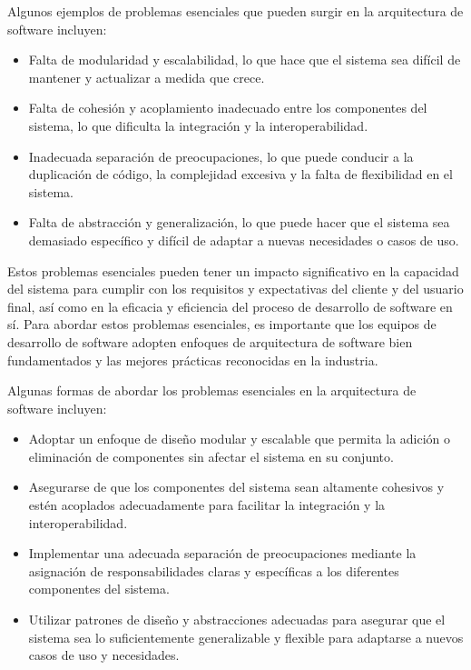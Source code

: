 \documentclass[executivepaper]{article}
\begin{document}
Algunos ejemplos de problemas esenciales que pueden surgir en la arquitectura de software incluyen:

\begin{itemize}
\item Falta de modularidad y escalabilidad, lo que hace que el sistema sea difícil de mantener y actualizar a medida que crece.
\item Falta de cohesión y acoplamiento inadecuado entre los componentes del sistema, lo que dificulta la integración y la interoperabilidad.
\item Inadecuada separación de preocupaciones, lo que puede conducir a la duplicación de código, la complejidad excesiva y la falta de flexibilidad en el sistema.
\item Falta de abstracción y generalización, lo que puede hacer que el sistema sea demasiado específico y difícil de adaptar a nuevas necesidades o casos de uso.
\end{itemize}

Estos problemas esenciales pueden tener un impacto significativo en la capacidad del sistema para cumplir con los requisitos y expectativas del cliente y del usuario final, así como en la eficacia y eficiencia del proceso de desarrollo de software en sí. Para abordar estos problemas esenciales, es importante que los equipos de desarrollo de software adopten enfoques de arquitectura de software bien fundamentados y las mejores prácticas reconocidas en la industria.

Algunas formas de abordar los problemas esenciales en la arquitectura de software incluyen:

\begin{itemize}
\item Adoptar un enfoque de diseño modular y escalable que permita la adición o eliminación de componentes sin afectar el sistema en su conjunto.
\item Asegurarse de que los componentes del sistema sean altamente cohesivos y estén acoplados adecuadamente para facilitar la integración y la interoperabilidad.
\item Implementar una adecuada separación de preocupaciones mediante la asignación de responsabilidades claras y específicas a los diferentes componentes del sistema.
\item Utilizar patrones de diseño y abstracciones adecuadas para asegurar que el sistema sea lo suficientemente generalizable y flexible para adaptarse a nuevos casos de uso y necesidades.
\end{itemize}
\end{document}
